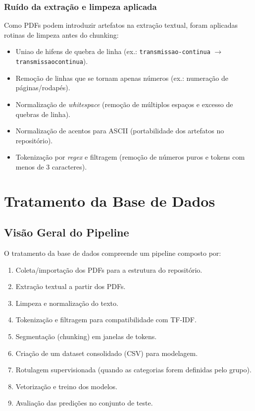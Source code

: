 \subsubsection{Ruído da extração e limpeza aplicada}

Como PDFs podem introduzir artefatos na extração textual, foram aplicadas rotinas de limpeza antes do chunking:

\begin{itemize}[leftmargin=1.2cm]
    \item Uniao de hifens de quebra de linha (ex.: \texttt{transmissao-continua} $\rightarrow$ \texttt{transmissaocontinua}).
    \item Remoção de linhas que se tornam apenas números (ex.: numeração de páginas/rodapés).
    \item Normalização de \textit{whitespace} (remoção de múltiplos espaços e excesso de quebras de linha).
    \item Normalização de acentos para ASCII (portabilidade dos artefatos no repositório).
    \item Tokenização por \textit{regex} e filtragem (remoção de números puros e tokens com menos de 3 caracteres).
\end{itemize}

\clearpage
\section{Tratamento da Base de Dados}

\subsection{Visão Geral do Pipeline}

O tratamento da base de dados compreende um pipeline composto por:

\begin{enumerate}[leftmargin=1.2cm]
    \item Coleta/importação dos PDFs para a estrutura do repositório.
    \item Extração textual a partir dos PDFs.
    \item Limpeza e normalização do texto.
    \item Tokenização e filtragem para compatibilidade com TF-IDF.
    \item Segmentação (chunking) em janelas de tokens.
    \item Criação de um dataset consolidado (CSV) para modelagem.
    \item Rotulagem supervisionada (quando as categorias forem definidas pelo grupo).
    \item Vetorização e treino dos modelos.
    \item Avaliação das predições no conjunto de teste.
\end{enumerate}

